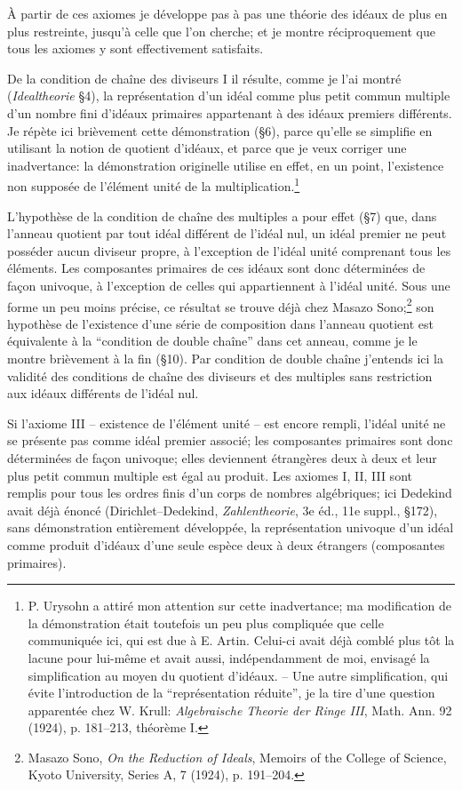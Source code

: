 À partir de ces axiomes je développe pas à pas une théorie des idéaux de plus en plus restreinte, jusqu'à celle que l'on cherche; et je montre réciproquement que tous les axiomes y sont effectivement satisfaits.

De la condition de chaîne des diviseurs I il résulte, comme je l'ai montré (\emph{Idealtheorie} \S{}4), la représentation d'un idéal comme plus petit commun multiple d'un nombre fini d'idéaux primaires appartenant à des idéaux premiers différents. Je répète ici brièvement cette démonstration (\S{}6), parce qu'elle se simplifie en utilisant la notion de quotient d'idéaux, et parce que je veux corriger une inadvertance: la démonstration originelle utilise en effet, en un point, l'existence non supposée de l'élément unité de la multiplication.\footnote{P. Urysohn a attiré mon attention sur cette inadvertance; ma modification de la démonstration était toutefois un peu plus compliquée que celle communiquée ici, qui est due à E. Artin. Celui-ci avait déjà comblé plus tôt la lacune pour lui-même et avait aussi, indépendamment de moi, envisagé la simplification au moyen du quotient d'idéaux. -- Une autre simplification, qui évite l'introduction de la ``représentation réduite'', je la tire d'une question apparentée chez W. Krull: \emph{Algebraische Theorie der Ringe III}, Math. Ann. 92 (1924), p. 181--213, théorème I.}

L'hypothèse de la condition de chaîne des multiples a pour effet (\S{}7) que, dans l'anneau quotient par tout idéal différent de l'idéal nul, un idéal premier ne peut posséder aucun diviseur propre, à l'exception de l'idéal unité comprenant tous les éléments. Les composantes primaires de ces idéaux sont donc déterminées de façon univoque, à l'exception de celles qui appartiennent à l'idéal unité. Sous une forme un peu moins précise, ce résultat se trouve déjà chez Masazo Sono;\footnote{Masazo Sono, \emph{On the Reduction of Ideals}, Memoirs of the College of Science, Kyoto University, Series A, 7 (1924), p. 191--204.} son hypothèse de l'existence d'une série de composition dans l'anneau quotient est équivalente à la ``condition de double chaîne'' dans cet anneau, comme je le montre brièvement à la fin (\S{}10). Par condition de double chaîne j'entends ici la validité des conditions de chaîne des diviseurs et des multiples sans restriction aux idéaux différents de l'idéal nul.

Si l'axiome III -- existence de l'élément unité -- est encore rempli, l'idéal unité ne se présente pas comme idéal premier associé; les composantes primaires sont donc déterminées de façon univoque; elles deviennent étrangères deux à deux et leur plus petit commun multiple est égal au produit. Les axiomes I, II, III sont remplis pour tous les ordres finis d'un corps de nombres algébriques; ici Dedekind avait déjà énoncé (Dirichlet--Dedekind, \emph{Zahlentheorie}, 3e éd., 11e suppl., \S{}172), sans démonstration entièrement développée, la représentation univoque d'un idéal comme produit d'idéaux d'une seule espèce deux à deux étrangers (composantes primaires).

